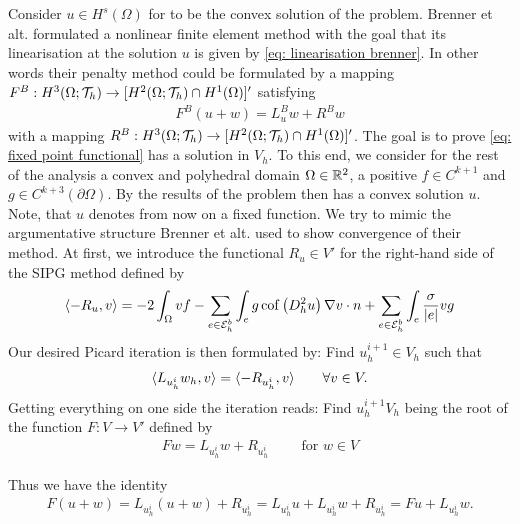 Consider $u\in H^s(\Omega)$ for  to be the convex solution of the \MA problem. Brenner et alt. formulated a nonlinear finite element method with the goal that its linearisation at the solution $u$ is given by \eqref{eq: linearisation brenner}. In other words their penalty method could be formulated by a mapping $F^B:H^3(\Omega; \mathcal{T}_h) \rightarrow [H^2(\Omega; \mathcal{T}_h) \cap H^1(\Omega)]'$ satisfying
 \begin{align}
 	F^B(u +w ) = L^B_u w + R^Bw \label{eq: add brenner method}
 \end{align}
 with a mapping $R^B:H^3(\Omega; \mathcal{T}_h) \rightarrow [H^2(\Omega; \mathcal{T}_h) \cap H^1(\Omega)]'$. 
% 
The goal is to prove \eqref{eq: fixed point functional} has a solution in $V_h$. To this end, we consider for the rest of the analysis a convex and polyhedral domain $\Omega\in \mathbb{R}^2$, a positive $f \in C^{k+1}$ and $g\in C^{k+3}(\partial \Omega)$. By the results of \cite{CNS1984} the \MA problem then has a convex solution $u$. Note, that $u$ denotes from now on a fixed function.
We try to mimic the argumentative structure Brenner et alt. used to show convergence of their method. At first, we introduce the functional $R_u \in V'$ for the right-hand side of the SIPG method defined by
\[
 \langle -R_u, v \rangle = - 2 \int_{\Omega}v f
-\sum\limits_{e \in \mathcal{E}_h^b}\int_{e} g \operatorname{cof} \left( D_h^2 u \right) \nabla v \cdot n 
+\sum\limits_{e \in \mathcal{E}_h^b} \int_e \frac \sigma {|e|} v g \label{eq: definition R}
\]
Our desired Picard iteration is then formulated by: Find $u^{i+1}_h \in V_h$ such that
\begin{align}
 \langle L_{u^i_h} w_h, v \rangle =   \langle -R_{u^i_h}, v \rangle   \qquad \forall v \in V. \label{eq: fixed point functional}
\end{align}
Getting everything on one side the iteration reads: Find $u_h^{i+1}V_h$ being the root of the function $F:V \rightarrow V'$ defined by
\begin{align*}
 {Fw} =  L_{u^i_h} w + R_{u^i_h}  \qquad \text{ for } w \in V
\end{align*}

Thus we have the identity 
\begin{align}
	F(u+w) = L_{u^i_h} (u+w) + R_{u^i_h} = L_{u^i_h} u +L_{u^i_h}w + R_{u^i_h} = Fu + L_{u^i_h}w. \label{eq: add our method}
\end{align}

